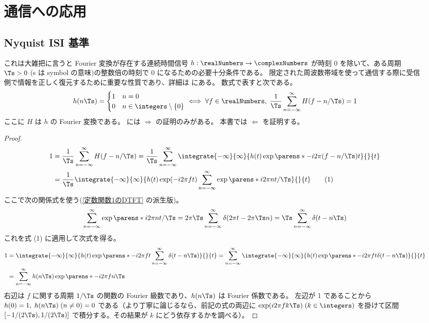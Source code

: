 \chapter{通信への応用}
    \section{Nyquist ISI 基準}
        これは大雑把に言うと Fourier 変換が存在する連続時間信号 $h:\realNumbers\to\complexNumbers$ が時刻 0 を除いて、ある周期 $\Ts>0$ (s は symbol の意味)の整数倍の時刻で 0 になるための必要十分条件である。
        限定された周波数帯域を使って通信する際に受信側で情報を正しく復元するために重要な性質であり、詳細は \cite{Nyquist_ISI_crit} にある。
        数式で表すと次である。
        \[
            h(n\Ts) = \begin{cases}
                1 & n=0 \\
                0 & n\in\integers\setminus\{0\}
            \end{cases}
            \iff \forall f\in\realNumbers,\;\frac{1}{\Ts}\sum_{n=-\infty}^\infty H(f-n/\Ts) = 1
        \]
        ここに $H$ は $h$ の Fourier 変換である。
        \cite{Nyquist_ISI_crit} には $\Rightarrow$ の証明のみがある。
        本書では $\Leftarrow$ を証明する。
        \begin{proof}
            \begin{align*}
                1 &= \frac{1}{\Ts}\sum_{n=-\infty}^\infty H(f-n/\Ts) = \frac{1}{\Ts}\sum_{n=-\infty}^\infty\integrate{-\infty}{\infty}{h(t)\exp\parens*{-i2\pi(f-n/\Ts)t}}{}{t} \\
                &= \frac{1}{\Ts}\integrate{-\infty}{\infty}{h(t)\exp(-i2\pi ft)\sum_{n=-\infty}^\infty\exp\parens*{i2\pi nt/\Ts}}{}{t} \tag{1}
            \end{align*}
            ここで次の関係式を使う(\ref{定数関数1のDTFT} の派生版)。
            \[ \sum_{n=-\infty}^\infty\exp\parens*{i2\pi nt/\Ts} = 2\pi\Ts\sum_{n=-\infty}^\infty\delta(2\pi t-2\pi\Ts n) = \Ts\sum_{n=-\infty}^\infty\delta(t-n\Ts) \]
            これを式 (1) に適用して次式を得る。
            \begin{align*}
                1 &= \integrate{-\infty}{\infty}{h(t)\exp\parens*{-i2\pi ft}\sum_{n=-\infty}^\infty\delta(t-n\Ts)}{}{t} = \sum_{n=-\infty}^\infty\integrate{-\infty}{\infty}{h(t)\exp\parens*{-i2\pi ft}\delta(t-n\Ts)}{}{t} \\
                &= \sum_{n=-\infty}^\infty h(n\Ts)\exp\parens*{-i2\pi fn\Ts}
            \end{align*}
            右辺は $f$ に関する周期 $1/\Ts$ の関数の Fourier 級数であり、$h(n\Ts)$ は Fourier 係数である。
            左辺が 1 であることから $h(0) = 1,\;h(n\Ts)\;(n\neq 0) = 0$ である（より丁寧に論じるなら、前記の式の両辺に $\exp(i2\pi fk\Ts)\;(k\in\integers)$ を掛けて区間 $[-1/(2\Ts),1/(2\Ts)]$ で積分する。その結果が $k$ にどう依存するかを調べる）。
        \end{proof}
